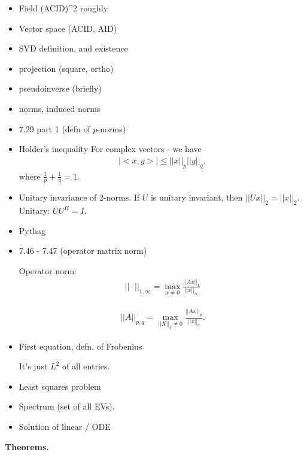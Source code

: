 \documentclass{article}
\begin{document}
\begin{itemize}
  \item Field (ACID)^2 roughly
  \item Vector space  (ACID, AID)
  \item SVD definition, and existence
  \item  projection (square, ortho)
  \item pseudoinverse (briefly)
  \item norms, induced norms
  \item 7.29 part 1 (defn of $p$-norms)
  \item Holder's inequality  For complex vectors - we have
    \begin{align*}
      | <x, y> | \leq ||x||_p ||y||_q,
    \end{align*}
    where $\frac{1}{p} + \frac{1}{q} = 1$.

  \item Unitary invariance of 2-norms.  If $U$ is unitary invariant, then $||U x||_2 = ||x||_2$.  Unitary: $U U^H = I$.

  \item Pythag
  \item  7.46 - 7.47 (operator matrix norm)

    Operator norm:
    \begin{align*}
      || \cdot ||_{1, \infty} = \max_{x \neq 0} \frac{||A x||_1}{||x||_{\infty}} 
    \end{align*}

    \begin{align*}
      ||A||_{p, q} = \max_{||X||_q \neq 0} \frac{||A x||_p}{||x||_q}.
    \end{align*}


  \item First equation, defn. of Frobenius

    It's just $L^2$ of all entries.

  \item Least squares problem
  \item Spectrum (set of all EVs).
  \item Solution of linear / ODE
\end{itemize}

{\bf Theorems.}
\end{document}
